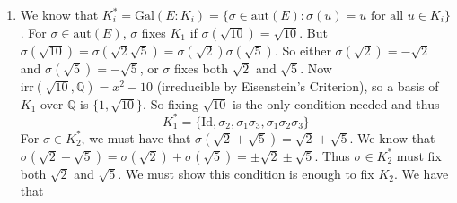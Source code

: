 \documentclass[11pt]{article}
\begin{document}
\begin{enumerate}[label={(\alph*)}, left=16pt]
\begin{align*}
      \text{irr}(\sqrt{2}, \mathbb{Q}) & = x^2 - 2 \\ 
      \text{irr}(\sqrt{3}, \mathbb{Q}) & = x^2 - 3 \\ 
      \text{irr}(\sqrt{5}, \mathbb{Q}) & = x^2 - 5 
    \end{align*}
    (All irreducible by Eisenstein's Criterion). For any $\sigma \in \text{Gal}(E:\mathbb{Q})$, we must have that $\sigma(\sqrt{2})$ is a root of $x^2 - 2$. The roots of $x^2 - 2$ are $\pm \sqrt{2}$. Similarly, $\sigma(\sqrt{3}) = \pm \sqrt{3}$ and $\sigma (\sqrt{5}) = \pm \sqrt{5}$, and $\sigma$ is uniquely determined by $\sigma(\sqrt{2}), \sigma(\sqrt{3}), \sigma(\sqrt{5})$. So $\text{Gal}(E:\mathbb{Q})$ has 8 elements. Define the automorphisms \[
    \sqrt{2}  \xmapsto{\sigma_1} - \sqrt{2}, \quad \sqrt{2}  \xmapsto{\sigma_2}  \sqrt{2}, \quad \sqrt{2}  \xmapsto{\sigma_3} \sqrt{2}
    \]
    \[
    \sqrt{3}  \xmapsto{\sigma_1} \sqrt{3}, \quad \sqrt{3}  \xmapsto{\sigma_2}  -\sqrt{3}, \quad \sqrt{3}  \xmapsto{\sigma_3} \sqrt{3}
    \]
    \[
    \sqrt{5}  \xmapsto{\sigma_1} \sqrt{5}, \quad \sqrt{5}  \xmapsto{\sigma_2}  \sqrt{5}, \quad \sqrt{5}  \xmapsto{\sigma_3} -\sqrt{5}
    \]
    And $\sigma_1, \sigma_2, \sigma_3$ all fix $\mathbb{Q}$. Then \[
    \text{Gal}(E:\mathbb{Q}) = \{\text{Id}, \sigma_1, \sigma_2, \sigma_3, \sigma_1\sigma_2, \sigma_1\sigma_3, \sigma_2\sigma_3, \sigma_1\sigma_2\sigma_3\} \cong \mathbb{Z}_2 \times \mathbb{Z}_2 \times \mathbb{Z}_2
    \]
    \item We know that $K_i^* = \text{Gal}(E:K_i) = \{\sigma \in \text{aut}(E) : \sigma(u) = u \text{ for all } u \in K_i\}$. For $\sigma \in \text{aut}(E)$, $\sigma$ fixes $K_1$ if $\sigma(\sqrt{10}) = \sqrt{10}$. But $\sigma(\sqrt{10}) = \sigma(\sqrt{2} \sqrt{5}) = \sigma(\sqrt{2}) \sigma(\sqrt{5})$. So either $\sigma(\sqrt{2}) = -\sqrt{2}$ and $\sigma(\sqrt{5}) = -\sqrt{5}$, or $\sigma$ fixes both $\sqrt{2}$ and $\sqrt{5}$. Now $\text{irr}(\sqrt{10}, \mathbb{Q}) = x^2 - 10$ (irreducible by Eisenstein's Criterion), so a basis of $K_1$ over $\mathbb{Q}$ is $\{1, \sqrt{10}\}$. So fixing $\sqrt{10}$ is the only condition needed and thus \[
    K_1^* = \{\text{Id}, \sigma_2, \sigma_1 \sigma_3, \sigma_1 \sigma_2 \sigma_3\}
    \]
    For $\sigma \in K_2^*$, we must have that $\sigma (\sqrt{2} + \sqrt{5}) = \sqrt{2} + \sqrt{5}$. We know that $\sigma(\sqrt{2} + \sqrt{5}) = \sigma(\sqrt{2}) + \sigma(\sqrt{5}) = \pm \sqrt{2} \pm \sqrt{5}$. Thus $\sigma \in K_2^*$ must fix both $\sqrt{2}$ and $\sqrt{5}$. We must show this condition is enough to fix $K_2$. We have that \[
\]
\end{enumerate}
\end{document}
